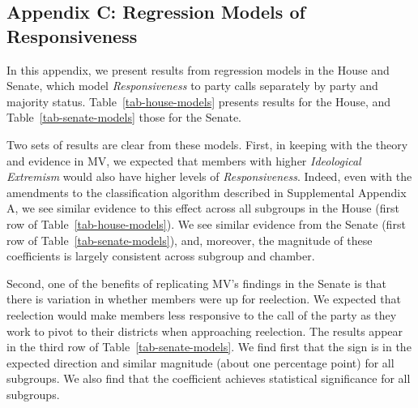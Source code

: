 \documentclass[12pt]{article}
\begin{document}
\clearpage


\subsection*{Appendix C: Regression Models of Responsiveness}
%


In this appendix, we present results from regression models in the House and
Senate, which model \textit{Responsiveness} to party calls separately by party
and majority status.
Table~\ref{tab-house-models} presents results for the House, and
Table~\ref{tab-senate-models} those for the Senate.

Two sets of results are clear from these models.
First, in keeping with the theory and evidence in MV, we expected that members
with higher \textit{Ideological Extremism} would also have higher levels of
\textit{Responsiveness}.
Indeed, even with the amendments to the classification algorithm described in
Supplemental Appendix A, we see similar evidence to this effect across all
subgroups in the House (first row of Table~\ref{tab-house-models}).
We see similar evidence from the Senate (first row of
Table~\ref{tab-senate-models}), and, moreover, the magnitude of these
coefficients is largely consistent across subgroup and chamber.

Second, one of the benefits of replicating MV's findings in the Senate is that
there is variation in whether members were up for reelection.
We expected that reelection would make members less responsive to the call of
the party as they work to pivot to their districts when approaching reelection.
The results appear in the third row of Table~\ref{tab-senate-models}.
We find first that the sign is in the expected direction and similar magnitude
(about one percentage point) for all subgroups.
We also find that the coefficient achieves statistical significance for all
subgroups.
\end{document}
